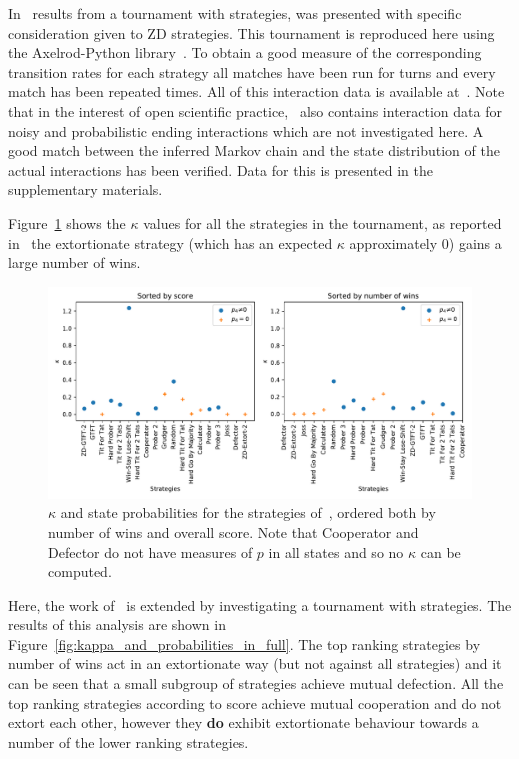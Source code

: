 \documentclass[a4paper]{article}
\begin{document}
In~\cite{Stewart2012} results from a tournament with
 strategies,
was presented with specific consideration given to ZD strategies. This
tournament is reproduced here using the Axelrod-Python
library~\cite{Knight2016}. To obtain a good measure of the corresponding
transition rates for each strategy all matches have been run for
turns and every match has been
repeated times. All of this
interaction data is available at~\cite{vincent_knight_2018_1297075}. Note that
in the interest of open scientific practice,~\cite{vincent_knight_2018_1297075}
also contains interaction data for noisy and probabilistic ending interactions
which are not investigated here. A good
match between the inferred Markov chain and the state distribution of the actual
interactions has been verified. Data for this is presented in the supplementary
materials.

Figure~\ref{fig:kappa_overall_in_stewart_plotkin} shows the
\(\kappa\) values for all the strategies in the tournament, as
reported in~\cite{Stewart2012} the extortionate strategy (which has an expected
\(\kappa\) approximately 0) gains a large number of wins.

\begin{figure}[!htbp]
    \centering
    \includegraphics[width=.8\textwidth]{./assets/img/kappa_overall_in_stewart_plotkin/main.pdf}
    \caption{\(\kappa\) and state probabilities for the strategies
        of~\cite{Stewart2012}, ordered both by number of wins and overall score.
        Note that Cooperator and Defector do not have measures of \(p\) in all
        states and so no \(\kappa\) can be computed.
        }
    \label{fig:kappa_overall_in_stewart_plotkin}
\end{figure}

Here, the work of~\cite{Stewart2012} is extended by investigating a tournament
with strategies. The
results of this analysis are shown in
Figure~\ref{fig:kappa_and_probabilities_in_full}. The top ranking strategies
by number of wins act in an extortionate way (but not against all strategies) and
it can be seen that a small subgroup of strategies achieve mutual defection.
All the top ranking strategies according to score achieve mutual cooperation and
do not extort each other, however they \textbf{do} exhibit extortionate
behaviour towards a number of the lower ranking strategies.
\end{document}
